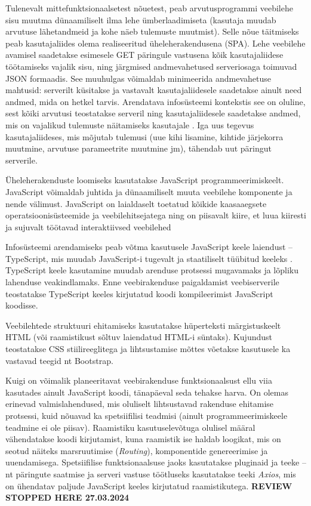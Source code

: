 Tulenevalt mittefunktsionaalsetest nõuetest, peab arvutusprogrammi veebilehe sisu muutma dünaamiliselt ilma
lehe ümberlaadimiseta (kasutaja muudab arvutuse lähetandmeid ja kohe näeb tulemuste muutmist). Selle nõue 
täitmiseks peab kasutajaliides olema realiseeritud üheleherakendusena (SPA). Lehe veebilehe avamisel saadetakse
esimesele GET päringule vastusena kõik kasutajaliidese töötamiseks vajalik sisu, ning järgmised andmevahetused
serveriosaga toimuvad JSON formaadis. See muuhulgas võimaldab minimeerida andmevahetuse mahtusid: 
serverilt küsitakse ja vastavalt kasutajaliidesele saadetakse ainult need andmed, mida on hetkel tarvis. 
Arendatava infosüsteemi kontekstis see on oluline, sest kõiki arvutusi teostatakse serveril ning kasutajaliidesele 
saadetakse andmed, mis on vajalikud tulemuste näitamiseks kasutajale \cite{about_spa}. Iga uus tegevus kasutajaliideses, mis mõjutab tulemusi 
(uue kihi lisamine, kihtide järjekorra muutmine, arvutuse parameetrite muutmine jm), tähendab uut päringut serverile.

Üheleherakenduste loomiseks kasutatakse JavaScript programmeerimiskeelt. JavaScript võimaldab juhtida ja dünaamiliselt muuta
veebilehe komponente ja nende välimust. JavaScript on laialdaselt toetatud kõikide kaasaaegsete operatsioonisüsteemide ja
veebilehitsejatega ning on piisavalt kiire, et luua kiiresti ja sujuvalt töötavad interaktiivsed veebilehed \cite{about_spa_js_book}  

Infosüsteemi arendamiseks peab võtma kasutusele JavaScript keele laiendust -- TypeScript, mis muudab JavaScript-i 
tugevalt ja staatiliselt tüübitud keeleks \cite{about_typescript}\cite{why_typescript_article}. TypeScript keele kasutamine
muudab arenduse protsessi mugavamaks ja lõpliku lahenduse veakindlamaks. Enne veebirakenduse paigaldamist veebiserverile
teostatakse TypeScript keeles kirjutatud koodi kompileerimist JavaScript koodisse.

Veebilehtede struktuuri ehitamiseks kasutatakse hüperteksti märgistuskeelt HTML (või raamistikust sõltuv laiendatud HTML-i süntaks). 
Kujundust teostatakse CSS stiilireeglitega ja lihtsustamise mõttes võetakse kasutusele ka vastavad teegid nt Bootstrap.

Kuigi on võimalik planeeritavat veebirakenduse funktsionaalsust ellu viia kasutades ainult JavaScript koodi, tänapäeval seda tehakse
harva. On olemas erinevad valmislahendused, mis oluliselt lihtsustavad rakenduse ehitamise protsessi, kuid 
nõuavad ka spetsiifilisi teadmisi (ainult programmeerimiskeele teadmine ei ole piisav). Raamistiku kasutuselevõtuga olulisel määral vähendatakse 
koodi kirjutamist, kuna raamistik ise haldab loogikat, mis on seotud näiteks marsruutimise (\textit{Routing}), komponentide
genereerimise ja uuendamisega. Spetsiifilise funktsionaalsuse jaoks kasutatakse pluginaid ja teeke -- nt
päringute saatmise ja serveri vastuse töötluseks kasutatakse teeki \textit{Axios}, mis on ühendatav paljude
JavaScript keeles kirjutatud raamistikutega. \textbf{REVIEW STOPPED HERE 27.03.2024}

